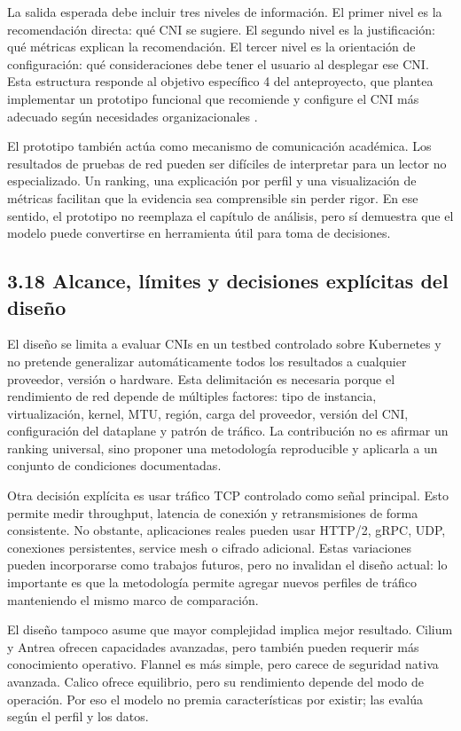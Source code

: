 La salida esperada debe incluir tres niveles de información. El primer nivel es la recomendación directa: qué CNI se sugiere. El segundo nivel es la justificación: qué métricas explican la recomendación. El tercer nivel es la orientación de configuración: qué consideraciones debe tener el usuario al desplegar ese CNI. Esta estructura responde al objetivo específico 4 del anteproyecto, que plantea implementar un prototipo funcional que recomiende y configure el CNI más adecuado según necesidades organizacionales \cite{ref29}.

El prototipo también actúa como mecanismo de comunicación académica. Los resultados de pruebas de red pueden ser difíciles de interpretar para un lector no especializado. Un ranking, una explicación por perfil y una visualización de métricas facilitan que la evidencia sea comprensible sin perder rigor. En ese sentido, el prototipo no reemplaza el capítulo de análisis, pero sí demuestra que el modelo puede convertirse en herramienta útil para toma de decisiones.

\subsection{3.18 Alcance, límites y decisiones explícitas del diseño}

El diseño se limita a evaluar CNIs en un testbed controlado sobre Kubernetes y no pretende generalizar automáticamente todos los resultados a cualquier proveedor, versión o hardware. Esta delimitación es necesaria porque el rendimiento de red depende de múltiples factores: tipo de instancia, virtualización, kernel, MTU, región, carga del proveedor, versión del CNI, configuración del dataplane y patrón de tráfico. La contribución no es afirmar un ranking universal, sino proponer una metodología reproducible y aplicarla a un conjunto de condiciones documentadas.

Otra decisión explícita es usar tráfico TCP controlado como señal principal. Esto permite medir throughput, latencia de conexión y retransmisiones de forma consistente. No obstante, aplicaciones reales pueden usar HTTP/2, gRPC, UDP, conexiones persistentes, service mesh o cifrado adicional. Estas variaciones pueden incorporarse como trabajos futuros, pero no invalidan el diseño actual: lo importante es que la metodología permite agregar nuevos perfiles de tráfico manteniendo el mismo marco de comparación.

El diseño tampoco asume que mayor complejidad implica mejor resultado. Cilium y Antrea ofrecen capacidades avanzadas, pero también pueden requerir más conocimiento operativo. Flannel es más simple, pero carece de seguridad nativa avanzada. Calico ofrece equilibrio, pero su rendimiento depende del modo de operación. Por eso el modelo no premia características por existir; las evalúa según el perfil y los datos.

